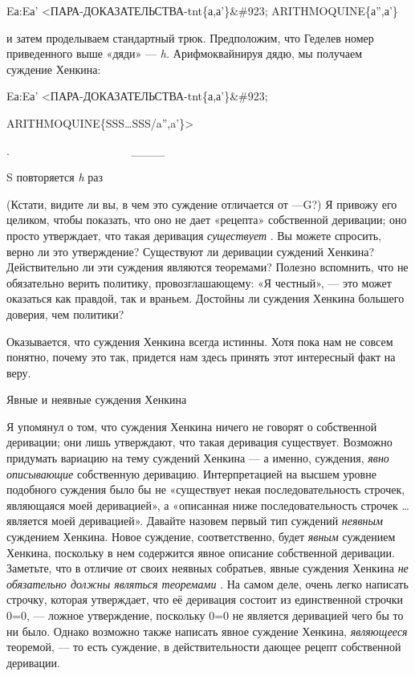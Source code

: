 \documentclass[../main.tex]{subfiles}
\begin{document}
Eа:Eа' \textless ПАРА-ДОКАЗАТЕЛЬСТВА-\acs{tnt}\{а,а'\}\&\#923; ARITHMOQUINE\{а'',а'\}

и затем проделываем стандартный трюк. Предположим, что Геделев номер приведенного выше «дяди» --- \emph{h.} Арифмоквайнируя дядю, мы получаем суждение Хенкина:

Eа:Eа' \textless ПАРА-ДОКАЗАТЕЛЬСТВА-\acs{tnt}\{а,а'\}\&\#923;

ARITHMOQUINE\{SSS\ldots SSS/a'',a'\}\textgreater{}

.~~~~~~~~~~~~~~~~~~~~~ \textbar\_\_\_\_\textbar{}

S повторяется \emph{h} раз

(Кстати, видите ли вы, в чем это суждение отличается от ---G?) Я привожу его целиком, чтобы показать, что оно не дает «рецепта» собственной деривации; оно просто утверждает, что такая деривация \emph{существует} . Вы можете спросить, верно ли это утверждение? Существуют ли деривации суждений Хенкина? Действительно ли эти суждения являются теоремами? Полезно вспомнить, что не обязательно верить политику, провозглашающему: «Я честный», --- это может оказаться как правдой, так и враньем. Достойны ли суждения Хенкина большего доверия, чем политики?

Оказывается, что суждения Хенкина всегда истинны. Хотя пока нам не совсем понятно, почему это так, придется нам здесь принять этот интересный факт на веру.

Явные и неявные суждения Хенкина

Я упомянул о том, что суждения Хенкина ничего не говорят о собственной деривации; они лишь утверждают, что такая деривация существует. Возможно придумать вариацию на тему суждений Хенкина --- а именно, суждения, \emph{явно описывающие} собственную деривацию. Интерпретацией на высшем уровне подобного суждения было бы не «существует некая последовательность строчек, являющаяся моей деривацией», а «описанная ниже последовательность строчек \ldots{} является моей деривацией». Давайте назовем первый тип суждений \emph{неявным} суждением Хенкина. Новое суждение, соответственно, будет \emph{явным} суждением Хенкина, поскольку в нем содержится явное описание собственной деривации. Заметьте, что в отличие от своих неявных собратьев, явные суждения Хенкина \emph{не обязательно должны являться теоремами} . На самом деле, очень легко написать строчку, которая утверждает, что её деривация состоит из единственной строчки 0=0, --- ложное утверждение, поскольку 0=0 не является деривацией чего бы то ни было. Однако возможно также написать явное суждение Хенкина, \emph{являющееся} теоремой, --- то есть суждение, в действительности дающее рецепт собственной деривации.
\end{document}
